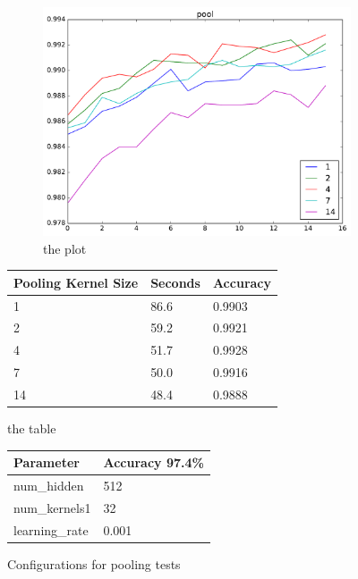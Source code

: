 \documentclass{article}
\begin{document}
\begin{enumerate}
\begin{item}
		
		\begin{figure}[h]
			\centering
			\begin{subfigure}[b]{0.45\textwidth}
				\includegraphics[width=\textwidth]{figures/pool_gpu}
				\caption{the plot}
				\label{fig:pooling_cpu}
			\end{subfigure}	
			\quad
			\begin{subtable}[b]{0.4\textwidth}
				\begin{tabular}{lll}
					\toprule
					Pooling Kernel Size     & Seconds & Accuracy \\
					\midrule
					1 & 86.6 & 0.9903 \\
					2 & 59.2 & 0.9921 \\
					4 & 51.7 & 0.9928 \\
					7 & 50.0 & 0.9916 \\
					14 & 48.4 & 0.9888 \\
					\bottomrule
				\end{tabular}
				\caption{the table}
				\label{pooling_comp_table}
			\end{subtable}
			\begin{subtable}[b]{0.8\textwidth}
				\caption{Configurations for pooling tests}
				\label{pool_conf}
				\centering
				\begin{tabular}{ll}
					\toprule
					Parameter     & Accuracy 97.4\%     \\
					\midrule
					num\_hidden & 512 \\
					num\_kernels1 & 32 \\
					learning\_rate & 0.001 \\

\end{tabular}
\end{subtable}
\end{figure}
\end{item}
\end{enumerate}
\end{document}
